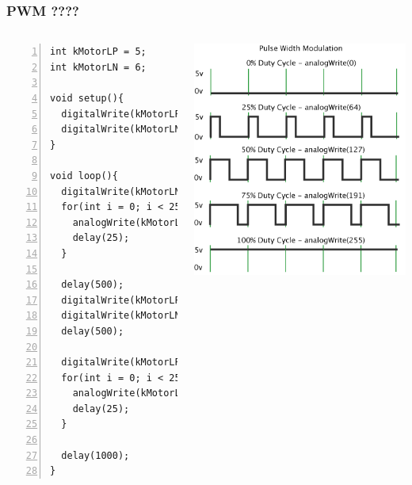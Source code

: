 \documentclass[compress]{beamer}
\begin{document}
\begin{frame}[fragile]
 \frametitle{PWM ????}
 \begin{columns}
\begin{Verbatim}[formatcom=\color{red},fontseries=b, numbers=left,numbersep=3pt, fontsize=\tiny]
int kMotorLP = 5;
int kMotorLN = 6;

void setup(){
  digitalWrite(kMotorLP, LOW);
  digitalWrite(kMotorLN, LOW); 
}

void loop(){
  digitalWrite(kMotorLN, LOW);
  for(int i = 0; i < 255; i++){
  	analogWrite(kMotorLP,  i);
  	delay(25);
  }
  
  delay(500);
  digitalWrite(kMotorLP, LOW);
  digitalWrite(kMotorLN, LOW);
  delay(500);
    
  digitalWrite(kMotorLP, LOW);
  for(int i = 0; i < 255; i++){
    analogWrite(kMotorLN,  i);
    delay(25);
  }
  
  delay(1000);
}
\end{Verbatim}
  \flushright
  \includegraphics[width=\columnwidth]{./img/PWM.png}
 \end{columns}

\begin{center}
 
\end{center}
\end{frame}
\end{document}
